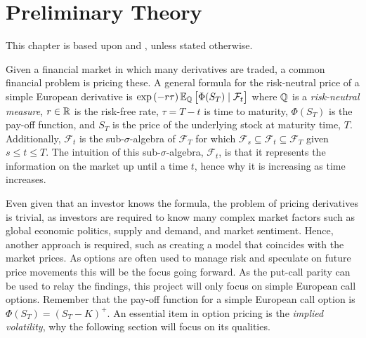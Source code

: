 \chapter{Preliminary Theory}\label{Ch.2}
This chapter is based upon \citep{Hull} and \citep{Cal}, unless stated otherwise.


Given a financial market in which many derivatives are traded, a common financial problem is pricing these. A general formula for the risk-neutral price of a simple European derivative is $\exp\left(-r\tau\right)\E[\Q]{\Phi(S_T)\mid \mathcal{F}_t}$ where $\mathbb{Q}$ is a \emph{risk-neutral measure}, $r\in\mathbb{R}$ is the risk-free rate, $\tau=T-t$ is time to maturity, $\Phi(S_T)$ is the pay-off function, and $S_T$ is the price of the underlying stock at maturity time, $T$. Additionally, $\mathcal{F}_t$ is the sub-$\sigma$-algebra of $\mathcal{F}_T$ for which $\mathcal{F}_s\subseteq\mathcal{F}_t\subseteq\mathcal{F}_T$ given $s\leq t\leq T$. The intuition of this sub-$\sigma$-algebra, $\mathcal{F}_t$, is that it represents the information on the market up until a time $t$, hence why it is increasing as time increases.

Even given that an investor knows the formula, the problem of pricing derivatives is trivial, as investors are required to know many complex market factors such as global economic politics, supply and demand, and market sentiment. Hence, another approach is required, such as creating a model that coincides with the market prices. As options are often used to manage risk and speculate on future price movements this will be the focus going forward. As the put-call parity can be used to relay the findings, this project will only focus on simple European call options. Remember that the pay-off function for a simple European call option is $\Phi(S_T) = (S_T - K)^+$. An essential item in option pricing is the \emph{implied volatility}, why the following section will focus on its qualities. %


